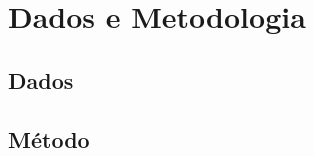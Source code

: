 \section{Dados e Metodologia}

\lipsum[1-3]

\subsection{Dados}

\lipsum[1-2]

\subsection{Método}

\lipsum[1-3]